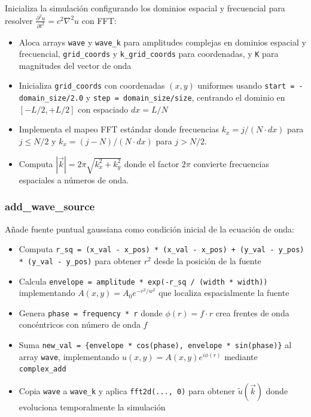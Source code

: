 \documentclass[a4paper]{article}
\begin{document}
Inicializa la simulación configurando los dominios espacial y frecuencial para resolver $\frac{\partial^2 u}{\partial t^2} = c^2 \nabla^2 u$ con FFT:

\begin{itemize}
    \item Aloca arrays \texttt{wave} y \texttt{wave\_k} para amplitudes complejas en dominios espacial y frecuencial, \texttt{grid\_coords} y \texttt{k\_grid\_coords} para coordenadas, y \texttt{K} para magnitudes del vector de onda
    \item Inicializa \texttt{grid\_coords} con coordenadas $(x,y)$ uniformes usando \texttt{start = -domain\_size/2.0} y \texttt{step = domain\_size/size}, centrando el dominio en $[-L/2, +L/2]$ con espaciado $dx = L/N$
    \item Implementa el mapeo FFT estándar donde frecuencias $k_x = j/(N \cdot dx)$ para $j \leq N/2$ y $k_x = (j-N)/(N \cdot dx)$ para $j > N/2$.
    \item Computa $|\vec{k}| = 2\pi\sqrt{k_x^2 + k_y^2}$ donde el factor $2\pi$ convierte frecuencias espaciales a números de onda.
\end{itemize}

\subsubsection{add\_wave\_source}

Añade fuente puntual gaussiana como condición inicial de la ecuación de onda:

\begin{itemize}
    \item Computa \texttt{r\_sq = (x\_val - x\_pos) * (x\_val - x\_pos) + (y\_val - y\_pos) * (y\_val - y\_pos)} para obtener $r^2$ desde la posición de la fuente
    \item Calcula \texttt{envelope = amplitude * exp(-r\_sq / (width * width))} implementando $A(x,y) = A_0 e^{-r^2/w^2}$ que localiza espacialmente la fuente
    \item Genera \texttt{phase = frequency * r} donde $\phi(r) = f \cdot r$ crea frentes de onda concéntricos con número de onda $f$
    \item Suma \texttt{new\_val = \{envelope * cos(phase), envelope * sin(phase)\}} al array \texttt{wave}, implementando $u(x,y) = A(x,y) e^{i\phi(r)}$ mediante \texttt{complex\_add}
    \item Copia \texttt{wave} a \texttt{wave\_k} y aplica \texttt{fft2d(..., 0)} para obtener $\tilde{u}(\vec{k})$ donde evoluciona temporalmente la simulación
\end{itemize}
\end{document}

